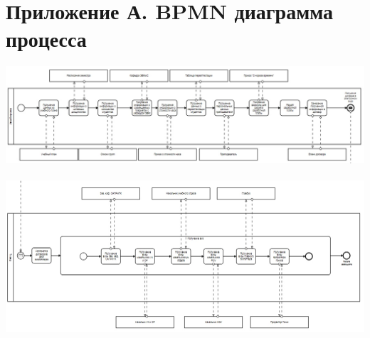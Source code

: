 \documentclass{article}
\begin{document}
\section*{Приложение А. BPMN диаграмма процесса}
 \includegraphics[width=\textwidth]{BPMN1.jpg}
 \\
 \\
 \includegraphics[width=\textwidth]{BPMN2.jpg}


 
\end{document}
